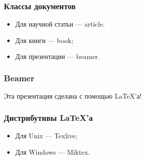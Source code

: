 \documentclass{beamer}
\begin{document}
\begin{frame}
  \frametitle{Классы документов}
  \begin{itemize}
    \item Для научной статьи — article.
    \item Для книги — book;
    \item Для презентации — beamer.
  \end{itemize} 
\end{frame}

\begin{frame}
  \frametitle{Beamer}
  Эта презентация сделана с помощью \LaTeX 'а!
  \begin{figure}[h!]
  \end{figure}
\end{frame}

\begin{frame}
  \frametitle{Дистрибутивы \LaTeX 'а}
  \begin{itemize}
    \item Для Unix — Texlive;
    \item Для Windows — Miktex.
  \end{itemize} 
\end{frame}
\end{document}
